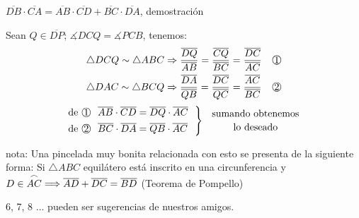 \parbox[][][t]{.67\linewidth}{
 $\overline{DB}\cdot\overline{CA} = \overline{AB}\cdot\overline{CD} + \overline{BC}\cdot\overline{DA}$, demostración
 
 \vspace{0.4cm}
 
 Sean $Q \in \overline{DP}$; $\measuredangle{DCQ} = \measuredangle{PCB}$, tenemos:
 \begin{equation*}
     \begin{aligned}
      \triangle DCQ \sim \triangle ABC &\Rightarrow \dfrac{\overline{DQ}}{\overline{AB}} = \dfrac{\overline{CQ}}{\overline{BC}} = \dfrac{\overline{DC}}{\overline{AC}} &\raisebox{.5pt}{\textcircled{\raisebox{-.9pt} {1}}}\\
      \triangle DAC \sim \triangle BCQ &\Rightarrow \dfrac{\overline{DA}}{\overline{QB}} = \dfrac{\overline{DC}}{\overline{QC}} = \dfrac{\overline{AC}}{\overline{BC}} &\raisebox{.5pt}{\textcircled{\raisebox{-.9pt} {2}}}
     \end{aligned}
 \end{equation*}
 \begin{equation*}
 \left.\begin{aligned}
     \text{de}~\raisebox{.5pt}{\textcircled{\raisebox{-.9pt} {1}}}~~\overline{AB}\cdot \overline{CD}&= \overline{DQ} \cdot \overline{AC} \\  
     \text{de}~\raisebox{.5pt}{\textcircled{\raisebox{-.9pt} {2}}}~~\overline{BC}\cdot \overline{DA}&= \overline{QB} \cdot \overline{AC} \\
       \end{aligned}
 ~~\right\}~~{\text{sumando obtenemos} \atop \text{lo deseado}}
\end{equation*}
}


\vspace{0.5cm}

\noindent nota: Una pincelada muy bonita relacionada con esto se presenta de la siguiente forma: Si $\triangle ABC$ equilátero está inscrito en una circunferencia y $D \in \overset{\Huge\frown}{AC} \Longrightarrow \overline{AD}+\overline{DC} = \overline{BD}$ (Teorema de Pompello)


\vspace{1cm}

6, 7, 8 ... pueden ser sugerencias de nuestros amigos.